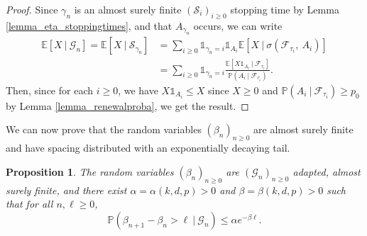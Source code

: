 \documentclass[a4paper, 11pt]{article}
\theoremstyle{plain}
\newtheorem{Proposition}[Theorem]{Proposition}
\theoremstyle{definition}
\newcommand{\E}{\mathbb{E}}
\renewcommand{\P}{\mathbb{P}}
\numberwithin{equation}{section}
\begin{document}
\begin{proof}
    Since $\gamma_n$ is an almost surely finite $(\mathcal S_i)_{i\geq 0}$ stopping time by Lemma \ref{lemma_eta_stoppingtimes}, and that $A_{\gamma_n}$ occurs, we can write
        \begin{equation*}
            \begin{split}
                \E[X~|~\mathcal G_n]=\E[X~|~\mathcal S_{\gamma_n}]
                &=\sum_{i\geq 0}\mathds 1_{\gamma_n=i}\mathds 1_{A_i}\E[X~|~\sigma(\mathcal F_{\tau_i},~A_i)]\\
                &=\sum_{i\geq 0}\mathds 1_{\gamma_n=i}\frac{\E[X\mathds 1_{A_i}~|~\mathcal F_{\tau_i}]}{\P(A_i~|~\mathcal F_{\tau_i})}.
            \end{split}
        \end{equation*}
    Then, since for each $i\geq 0$, we have $X\mathds 1_{A_i}\leq X$ since $X\geq 0$ and $\P(A_i~|~\mathcal F_{\tau_i})\geq p_0$ by Lemma \ref{lemma_renewalproba}, we get the result.
\end{proof}


We can now prove that the random variables $(\beta_n)_{n\geq0}$ are almost surely finite and have spacing distributed with an exponentially decaying tail.


\begin{Proposition}
    \label{prop_nu_stoppingtimes}
    The random variables $(\beta_n)_{n\geq 0}$ are $(\mathcal G_n)_{n\geq 0}$ adapted, almost surely finite, and there exist $\alpha=\alpha(k, d, p)>0$ and $\beta=\beta(k, d,p)>0$ such that for all $n,\ell\geq 0$,
        \[\P(\beta_{n+1}-\beta_n>\ell~|~\mathcal G_n)\leq\alpha e^{-\beta \ell}.\]
\end{Proposition}
\end{document}
